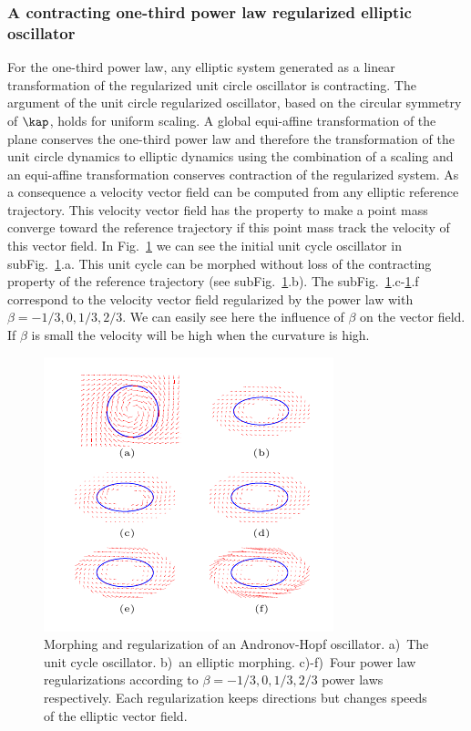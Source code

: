 \subsubsection{A contracting one-third power law regularized elliptic oscillator }
For the one-third power law, any elliptic system generated as a linear transformation of the regularized unit circle oscillator is contracting. The argument of the unit circle regularized oscillator, based on the circular symmetry of $\kap$, holds for uniform scaling. A global equi-affine transformation of the plane conserves the one-third power law and therefore the transformation of the unit circle dynamics to elliptic dynamics using the combination of a scaling and an equi-affine transformation conserves contraction of the regularized system.
As a consequence a velocity vector field can be computed from any elliptic reference trajectory.
This velocity vector field has the property to make a point mass converge toward the reference trajectory if this point mass track the velocity of this vector field.
In Fig.~\ref{fig:ellipsis:power:laws} we can see the initial unit cycle oscillator in subFig.~\ref{fig:ellipsis:power:laws}.a.
This unit cycle can be morphed without loss of the contracting property of the reference trajectory (see subFig.~\ref{fig:ellipsis:power:laws}.b).
The subFig.~\ref{fig:ellipsis:power:laws}.c-\ref{fig:ellipsis:power:laws}.f correspond to the velocity vector field regularized by the power law with $\beta = -1/3,0,1/3,2/3$.
We can easily see here the influence of $\beta$ on the vector field.
If $\beta$ is small the velocity will be high when the curvature is high.

\begin{figure}[ht]
	\centering
        \includegraphics[trim=0.3cm 0.3cm 0.3cm 0.2cm,width=0.5\linewidth]{./figures/morphing.pdf}
	\caption{Morphing and regularization of an Andronov-Hopf oscillator. a)~The unit cycle oscillator. b)~an elliptic morphing. c)-f)~Four power law regularizations according to $\beta = -1/3,0,1/3,2/3$ power laws respectively. Each regularization keeps directions but changes speeds of the elliptic vector field.}
	\label{fig:ellipsis:power:laws}
\end{figure}


